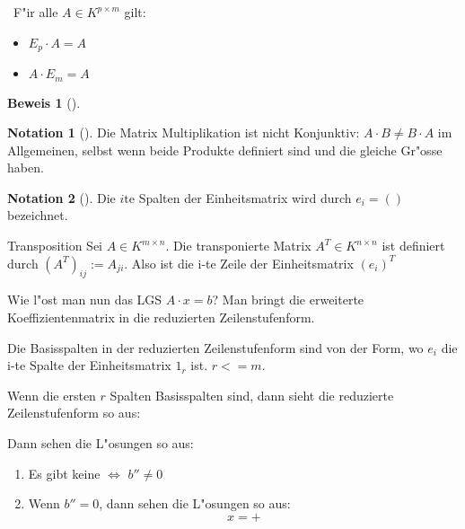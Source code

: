 \documentclass[oneside,fontsize=11pt,paper=a4,BCOR=0mm,DIV=12,automark,headsepline]{scrbook}
\theoremstyle{remark}
\theoremstyle{definition}
\newtheorem*{notation}{Notation}
\theoremstyle{definition}
\newtheorem*{prof}{Beweis}
\theoremstyle{remark}
\begin{document}
\begin{theo}{}{} \
F"ir alle \(A\in K^{p\times m}\) gilt:
\begin{itemize}
\item \(E_p\cdot A=A\)
\item \(A\cdot E_m =A\)
\end{itemize}
\end{theo}

\begin{prof}[] \label{}

\end{prof}


\begin{notation}[] \label{Vorsicht!}
Die Matrix Multiplikation ist nicht Konjunktiv: \(A\cdot B\not= B\cdot A\) im
Allgemeinen, selbst wenn beide Produkte definiert sind und die gleiche Gr"osse
haben.
\end{notation}

\begin{exa} \label{}

\end{exa}

\begin{notation}[] \label{}
Die \(i\text{te}\) Spalten der Einheitsmatrix wird durch \(e_i=()\) bezeichnet.
\end{notation}

\begin{definition}{Transposition}{}
Sei \(A\in K^{m\times n}\). Die transponierte Matrix \(A^{T}\in K^{n\times n}\) ist
definiert durch \((A^T)_{ij}:=A_{ji}\). Also ist die i-te Zeile der Einheitsmatrix \((e_i)^T\)
\end{definition}

Wie l"ost man nun das LGS \(A\cdot x=b\)? Man bringt die erweiterte
Koeffizientenmatrix in die reduzierten Zeilenstufenform.

\begin{relation}
Die Basisspalten in der reduzierten Zeilenstufenform sind von der Form, wo \(e_i\)
die i-te Spalte der Einheitsmatrix \(1_r\) ist. \(r <= m\).
\end{relation}

Wenn die ersten \(r\) Spalten Basisspalten sind, dann sieht die reduzierte
Zeilenstufenform so aus:


Dann sehen die L"osungen so aus:
\begin{relation}
\begin{enumerate}
\item Es gibt keine \(\iff\) \(b''\not= 0\)
\item Wenn \(b''=0\), dann sehen die L"osungen so aus: \[x=+\]
\end{enumerate}
\end{relation}
\end{document}

